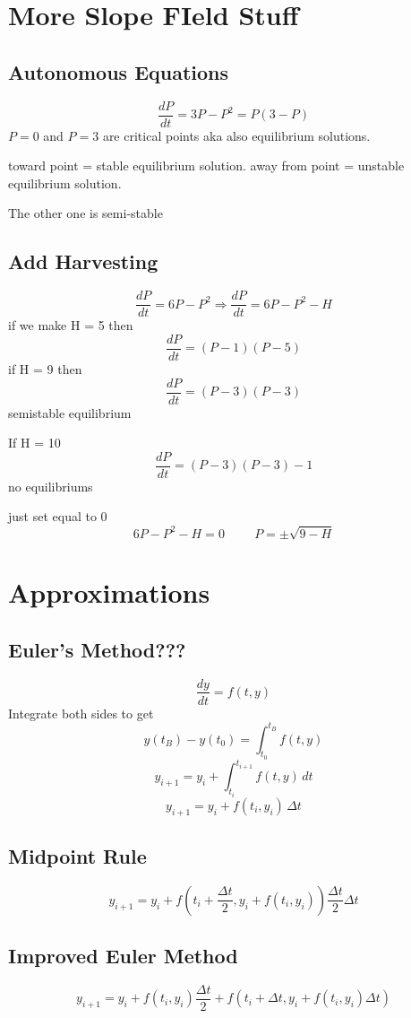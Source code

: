 \documentclass[fleqn]{report}
\newcommand{\hp}{\hspace{1cm}}
\begin{document}
\chapter{More Slope FIeld Stuff}

\section{Autonomous Equations}
\[
\frac{dP}{dt} = 3P - P^2 = P(3 - P)
\]
$P = 0$ and $P = 3$ are critical points aka also equilibrium solutions.

toward point = stable equilibrium solution. away from point = unstable equilibrium solution.

The other one is semi-stable

\section{Add Harvesting}
\[
\frac{dP}{dt} = 6P - P^2
\Longrightarrow
\frac{dP}{dt} = 6P - P^2 - H
\]
if we make H = 5 then
\[
\frac{dP}{dt} = (P - 1)(P - 5)
\]
if H = 9 then
\[
\frac{dP}{dt} = (P - 3)(P - 3)
\]
semistable equilibrium

If H = 10
\[
\frac{dP}{dt} = (P - 3)(P - 3) - 1
\]
no equilibriums

just set equal to 0
\[
6P - P^2 - H = 0
\hp
P = \pm \sqrt{9 - H}
\]

\chapter{Approximations}
\section{Euler's Method???}
\[
\frac{dy}{dt} = f(t, y)
\]
Integrate both sides to get
\[
y(t_B) - y(t_0) = \int^{t_B}_{t_0} f(t, y)
\]
\[
y_{i + 1} = y_i + \int^{t_{i + 1}}_{t_{i}} f(t, y) \, dt
\]
\[
y_{i + 1} = y_i + f(t_i, y_i) \, \Delta t
\]


\section{Midpoint Rule}
\[
y_{i + 1} = y_i + f(t_i + \frac{\Delta t}{2}, y_i + f(t_i, y_i)) \frac{\Delta t}{2} \Delta t
\]


\section{Improved Euler Method}
\[
y_{i + 1} = y_i + f(t_i, y_i) \frac{\Delta t}{2} + f(t_i + \Delta t, y_i + f(t_i, y_i) \Delta t)
\]
\end{document}
